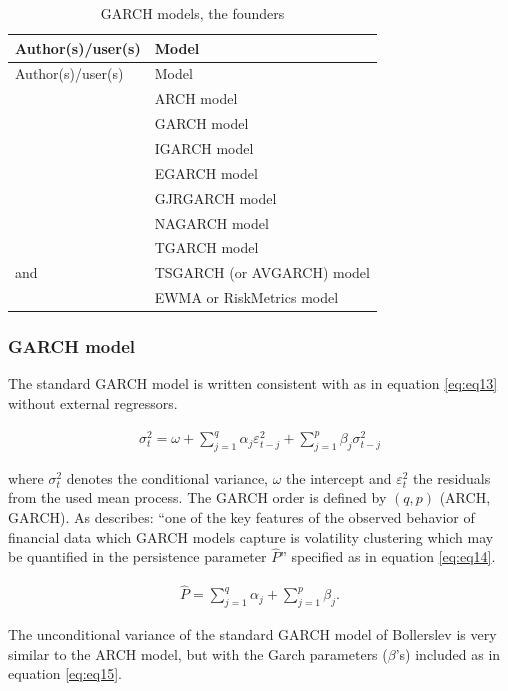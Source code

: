 \documentclass[a4paper, twoside]{templates/ociamthesis}
\begin{document}
\begin{longtable}[]{@{}ll@{}}
\caption{GARCH models, the founders}\tabularnewline
\toprule
Author(s)/user(s) & Model\tabularnewline
\midrule
\endfirsthead
\toprule
Author(s)/user(s) & Model\tabularnewline
\midrule
\endhead
\textcite{engle1982} & ARCH model\tabularnewline
\textcite{bollerslev1986} & GARCH model\tabularnewline
\textcite{bollerslev1986} & IGARCH model\tabularnewline
\textcite{nelson1991} & EGARCH model\tabularnewline
\textcite{glosten1993} & GJRGARCH model\tabularnewline
\textcite{engle1993} & NAGARCH model\tabularnewline
\textcite{zakoian1994} & TGARCH model\tabularnewline
\textcite{taylor1986} and \textcite{schwert1989} & TSGARCH (or AVGARCH) model\tabularnewline
\textcite{morganguarantytrustcompany1996} & EWMA or RiskMetrics model\tabularnewline
\bottomrule
\end{longtable}

\newpage

\hypertarget{garch-model}{%
\subsubsection{GARCH model}\label{garch-model}}

\noindent The standard GARCH model \autocite{bollerslev1986} is written consistent with \textcite{ghalanos2020} as in equation \eqref{eq:eq13} without external regressors.

\begin{align}
\sigma_t^2 = \omega  + \sum\limits_{j = 1}^q {{\alpha_j}\varepsilon _{t-j}^2 +} \sum\limits_{j=1}^p {{\beta_j}\sigma_{t-j}^2} 
 \label{eq:eq13}
\end{align}

\noindent where \(\sigma_t^2\) denotes the conditional variance, \(\omega\) the intercept and \(\varepsilon_t^2\) the residuals from the used mean process. The GARCH order is defined by \((q, p)\) (ARCH, GARCH). As \textcite{ghalanos2020} describes: ``one of the key features of the observed behavior of financial data which GARCH models capture is volatility clustering which may be quantified in the persistence parameter \(\hat{P}\)'' specified as in equation \eqref{eq:eq14}.

\begin{align}
\hat{P} = \sum\limits_{j = 1}^q {{\alpha_j}}  + \sum\limits_{j = 1}^p {{\beta_j}}.
 \label{eq:eq14}
\end{align}

\noindent The unconditional variance of the standard GARCH model of Bollerslev is very similar to the ARCH model, but with the Garch parameters (\(\beta\)'s) included as in equation \eqref{eq:eq15}.
\end{document}
